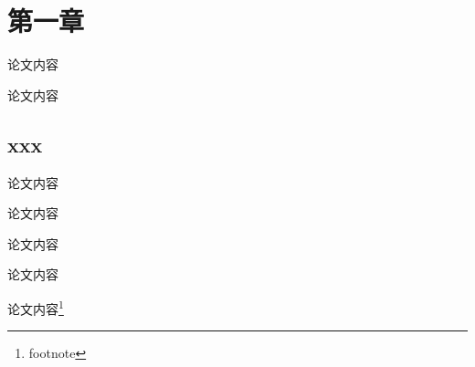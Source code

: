\documentclass[a4paper,12pt]{ctexart}
\newcommand{\学年学期}{2020-2021学年第1学期}
\newcommand{\课程名称}{课程名}
\newcommand{\论文题目}{论文题目}
\newcommand{\任课教师}{教师名}
\newcommand{\系别}{中国电影高新技术研究院}
\newcommand{\研究方向}{数字电影技术}
\newcommand{\姓名}{姓名}
\newcommand{\年级}{2021}
\newcommand{\学号}{04212193}
\newcommand{\完成时间}{2023年9月3日}
\begin{document}
\makecoverpage

\section{第一章}

论文内容

论文内容

\subsection{xxx}
论文内容

论文内容

论文内容

论文内容

论文内容\footnote{footnote}
\end{document}
